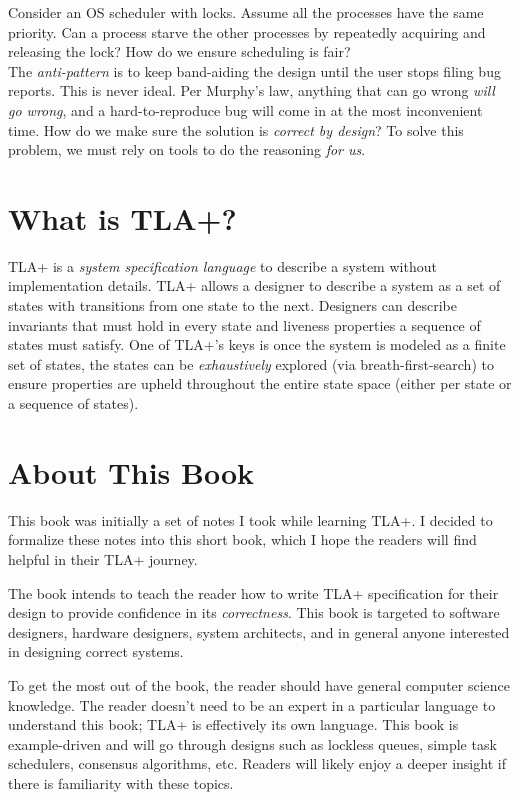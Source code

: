 Consider an OS scheduler with locks. Assume all the processes have the same
priority. Can a process starve the other processes by repeatedly acquiring and
releasing the lock? How do we ensure scheduling is fair?\\

The \textit{anti-pattern} is to keep band-aiding the design until the user stops
filing bug reports. This is never ideal. Per Murphy's law, anything that can go
wrong \textit{will go wrong}, and a hard-to-reproduce bug will come in at the
most inconvenient time. How do we make sure the solution is \textit{correct by
design}? To solve this problem, we must rely on tools to do the reasoning
\textit{for us}.

\section{What is TLA+?}

TLA+ is a \textit{system specification language} to describe a system
without implementation details. TLA+ allows a designer to describe a system as a
set of states with transitions from one state to the next. Designers can
describe invariants that must hold in every state and liveness properties a
sequence of states must satisfy. One of TLA+'s keys is once the system is modeled
as a finite set of states, the states can be \textit{exhaustively} explored
(via breath-first-search) to ensure properties are upheld throughout the entire
state space (either per state or a sequence of states).

\section{About This Book}
This book was initially a set of notes I took while learning TLA+. I decided to
formalize these notes into this short book, which I hope the readers will find
helpful in their TLA+ journey.\newline

The book intends to teach the reader how to write TLA+ specification for their
design to provide confidence in its \textit{correctness}. This book is targeted
to software designers, hardware designers, system architects, and in general
anyone interested in designing correct systems.\newline 

To get the most out of the book, the reader should have general computer science
knowledge. The reader doesn't need to be an expert in a particular language to
understand this book; TLA+ is effectively its own language. This book is
example-driven and will go through designs such as lockless queues, simple task
schedulers, consensus algorithms, etc. Readers will likely enjoy a deeper
insight if there is familiarity with these topics.

